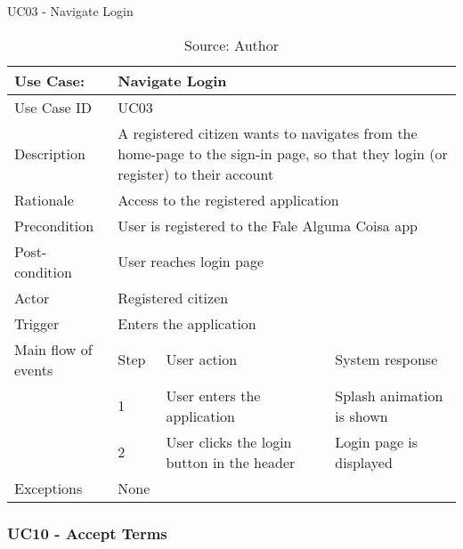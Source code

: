 \begin{table}[h]
\centering
\caption{UC03 - Navigate Login}
\label{uc:03}
\begin{tabular}{|p{3cm}|p{1cm}|p{5cm}|p{5cm}|}
\hline
Use Case:       & \multicolumn{3}{p{11cm}|}{Navigate Login} \\ \hline
Use Case ID     & \multicolumn{3}{p{11cm}|}{UC03} \\ \hline
Description     & \multicolumn{3}{p{11cm}|}{A registered citizen wants to navigates from the home-page to the sign-in page, so that they login (or register) to their account} \\ \hline
Rationale       & \multicolumn{3}{p{11cm}|}{Access to the registered application} \\ \hline
Precondition    & \multicolumn{3}{p{11cm}|}{User is registered to the Fale Alguma Coisa app} \\ \hline
Post-condition  & \multicolumn{3}{p{11cm}|}{User reaches login page} \\ \hline
Actor           & \multicolumn{3}{p{11cm}|}{Registered citizen} \\ \hline
Trigger         & \multicolumn{3}{p{11cm}|}{Enters the application} \\ \hline
Main flow of events & Step  & User action & System response \\ \hline
                    & 1     & User enters the application & Splash animation is shown \\ \hline
                    & 2     & User clicks the login button in the header & Login page is displayed \\ \hline
Exceptions      & \multicolumn{3}{p{11cm}|}{None} \\ \hline
\end{tabular}
\caption*{Source: Author}
\end{table}


\subsubsection{UC10 - Accept Terms}

